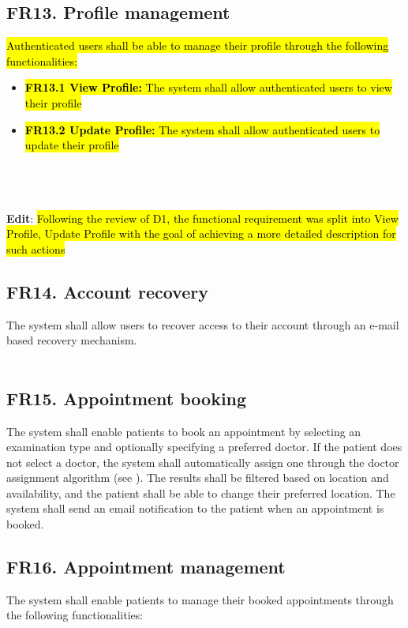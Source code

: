 \documentclass[12pt, a4paper]{article}
\begin{document}
\subsection{FR13. Profile management} \label{FR13}
\hl{Authenticated users shall be able to manage their profile through the following functionalities:}
\begin{itemize}
    \item \hl{\textbf{FR13.1 View Profile:} The system shall allow authenticated users to view their profile}
    \item \hl{\textbf{FR13.2 Update Profile:} The system shall allow authenticated users to update their profile}
\end{itemize}
\\ 
\\
\\ \textbf{Edit}:
\hl{Following the review of D1, the functional requirement was split into View Profile, Update Profile with the goal of achieving a more detailed description for such actions}

\subsection{FR14. Account recovery}\label{FR14}
The system shall allow users to recover access to their account through an e-mail based recovery mechanism.
\\  
\\ 

\subsection{FR15. Appointment booking} \label{FR15}
The system shall enable patients to book an appointment by selecting an examination type and optionally specifying a preferred doctor. If the patient does not select a doctor, the system shall automatically assign one through the doctor assignment algorithm (see ). The results shall be filtered based on location and availability, and the patient shall be able to change their preferred location. The system shall send an email notification to the patient when an appointment is booked.

\subsection{FR16. Appointment management} \label{FR16}
The system shall enable patients to manage their booked appointments through the following functionalities:
\end{document}
